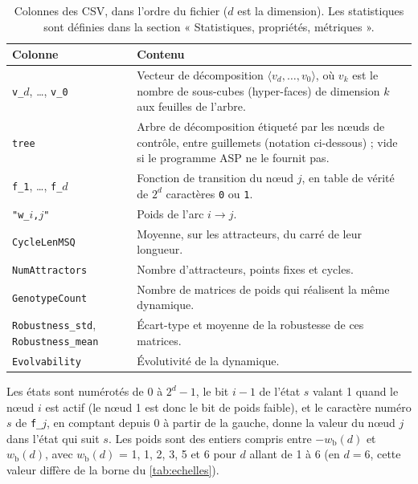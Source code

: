 \begin{table}[htbp]
\centering
\footnotesize
\setlength{\tabcolsep}{4pt}
\renewcommand{\arraystretch}{1.2}
\begin{tabular}{@{}>{\raggedright\arraybackslash}p{3.3cm} >{\raggedright\arraybackslash}p{11.9cm}@{}}
\toprule
Colonne & Contenu \\
\midrule
\texttt{v\_}$d$, \dots, \texttt{v\_0} & Vecteur de décomposition $\langle v_d,\dots,v_0\rangle$, où $v_k$ est le nombre de sous-cubes (hyper-faces) de dimension $k$ aux feuilles de l'arbre. \\
\texttt{tree} & Arbre de décomposition étiqueté par les nœuds de contrôle, entre guillemets (notation ci-dessous) ; vide si le programme ASP ne le fournit pas. \\
\texttt{f\_1}, \dots, \texttt{f\_}$d$ & Fonction de transition du nœud $j$, en table de vérité de $2^d$ caractères \texttt{0} ou \texttt{1}. \\
\texttt{"w\_}$i$\texttt{,}$j$\texttt{"} & Poids de l'arc $i \to j$. \\
\texttt{CycleLenMSQ} & Moyenne, sur les attracteurs, du carré de leur longueur. \\
\texttt{NumAttractors} & Nombre d'attracteurs, points fixes et cycles. \\
\texttt{GenotypeCount} & Nombre de matrices de poids qui réalisent la même dynamique. \\
\texttt{Robustness\_std}, \texttt{Robustness\_mean} & Écart-type et moyenne de la robustesse de ces matrices. \\
\texttt{Evolvability} & Évolutivité de la dynamique. \\
\bottomrule
\end{tabular}
\caption{Colonnes des CSV, dans l'ordre du fichier ($d$ est la dimension). Les statistiques sont définies dans la section « Statistiques, propriétés, métriques ».}
\label{tab:a-colonnes}
\end{table}

Les états sont numérotés de $0$ à $2^d-1$, le bit $i-1$ de l'état $s$ valant 1 quand le nœud $i$ est actif (le nœud 1 est donc le bit de poids faible), et le caractère numéro $s$ de \texttt{f\_}$j$, en comptant depuis 0 à partir de la gauche, donne la valeur du nœud $j$ dans l'état qui suit $s$.
Les poids sont des entiers compris entre $-w_{\mathrm{b}}(d)$ et $w_{\mathrm{b}}(d)$, avec $w_{\mathrm{b}}(d)$ = 1, 1, 2, 3, 5 et 6 pour $d$ allant de 1 à 6 (en $d=6$, cette valeur diffère de la borne du \cref{tab:echelles}).

